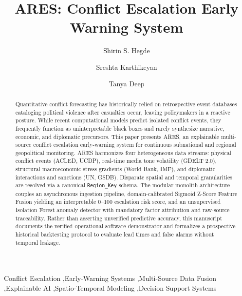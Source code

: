 \documentclass[preprint,12pt]{elsarticle}
\begin{document}
\begin{frontmatter}

\title{ARES: Conflict Escalation Early Warning System}

\author{Shirin S. Hegde}

\author{Sreshta Karthikeyan}

\author{Tanya Deep}


\begin{abstract}
Quantitative conflict forecasting has historically relied on retrospective event databases cataloging political violence after casualties occur, leaving policymakers in a reactive posture. While recent computational models predict isolated conflict events, they frequently function as uninterpretable black boxes and rarely synthesize narrative, economic, and diplomatic precursors. This paper presents ARES, an explainable multi-source conflict escalation early-warning system for continuous subnational and regional geopolitical monitoring. ARES harmonizes four heterogeneous data streams: physical conflict events (ACLED, UCDP), real-time media tone volatility (GDELT 2.0), structural macroeconomic stress gradients (World Bank, IMF), and diplomatic interactions and sanctions (UN, GSDB). Disparate spatial and temporal granularities are resolved via a canonical \texttt{Region\_Key} schema. The modular monolith architecture couples an asynchronous ingestion pipeline, domain-calibrated Sigmoid Z-Score Feature Fusion yielding an interpretable 0--100 escalation risk score, and an unsupervised Isolation Forest anomaly detector with mandatory factor attribution and raw-source traceability. Rather than asserting unverified predictive accuracy, this manuscript documents the verified operational software demonstrator and formalizes a prospective historical backtesting protocol to evaluate lead times and false alarms without temporal leakage.
\end{abstract}



\begin{keyword}
Conflict Escalation \sep Early-Warning Systems \sep Multi-Source Data Fusion \sep Explainable AI \sep Spatio-Temporal Modeling \sep Decision Support Systems
\end{keyword}

\end{frontmatter}
\end{document}
